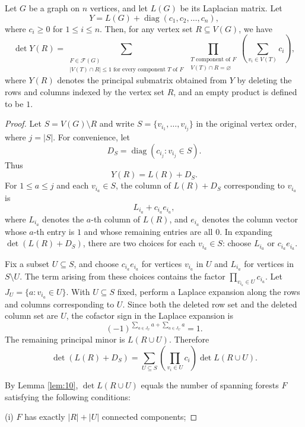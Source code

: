 \documentclass[11pt, a4paper]{article}
\begin{document}
\begin{lemma}\label{lem:11}
Let $G$ be a graph on $n$ vertices, and let $L(G)$ be its Laplacian matrix. Let
\[
Y=L(G)+\operatorname{diag}(c_1, c_2, \dots, c_n),
\]
where $c_i \geq 0$ for $1 \leq i \leq n$.
Then, for any vertex set $R\subseteq V(G)$, we have
\[
\det Y(R)
=
\sum_{\substack{F\in\mathcal{F}(G)\\
|V(T)\cap R|\le 1 \text{ for every component } T \text{ of } F}}
\prod_{\substack{T \text{ component of } F\\
V(T)\cap R=\varnothing}}
\left(\sum_{v_i \in V(T)}c_i\right),
\]
where $Y(R)$ denotes the principal submatrix obtained from $Y$ by deleting the rows and columns indexed by the vertex set $R$, and an empty product is defined to be $1$.
\end{lemma}
\begin{proof}
Let $S=V(G)\setminus R$ and write $S=\{v_{i_1}, \ldots, v_{i_j}\}$ in the original vertex order, where $j=|S|$.
For convenience, let
\[
D_S=\operatorname{diag}(c_{i_j}: v_{i_j}\in S).
\]
Thus
\[
Y(R)=L(R)+D_S.
\]
For $1\leq a\leq j$ and each $v_{i_a}\in S$, the column of $L(R)+D_S$ corresponding to $v_{i_a}$ is
\[
L_{i_a}+c_{i_a}e_{i_a},
\]
where $L_{i_a}$ denotes the $a$-th column of $L(R)$, and $e_{i_a}$ denotes the column vector whose $a$-th entry is $1$ and whose remaining entries are all $0$.
In expanding $\det(L(R)+D_S)$, there are two choices for each $v_{i_a}\in S$: choose $L_{i_a}$ or $c_{i_a}e_{i_a}$.

Fix a subset $U\subseteq S$, and choose $c_{i_a}e_{i_a}$ for vertices $v_{i_a}$ in $U$ and $L_{i_a}$ for vertices in $S\setminus U$.
The term arising from these choices contains the factor $\prod_{v_{i_a}\in U}c_{i_a}$.
Let $J_U=\{a: v_{i_a}\in U\}$.
With $U\subseteq S$ fixed, perform a Laplace expansion along the rows and columns corresponding to $U$.
Since both the deleted row set and the deleted column set are $U$, the cofactor sign in the Laplace expansion is
\[
(-1)^{\sum_{a\in J_U}a+\sum_{a\in J_U}a}=1.
\]
The remaining principal minor is $L(R\cup U)$.
Therefore
\begin{equation}\label{eq:20}
\det(L(R)+D_S)
=
\sum_{U\subseteq S}
\left(
\prod_{v_i\in U}c_i
\right)
\det L(R\cup U).
\end{equation}

By Lemma \ref{lem:10},
$\det L(R\cup U)$
equals the number of spanning forests $F$ satisfying the following conditions:

(i) $F$ has exactly $|R|+|U|$ connected components;


\end{proof}
\end{document}

